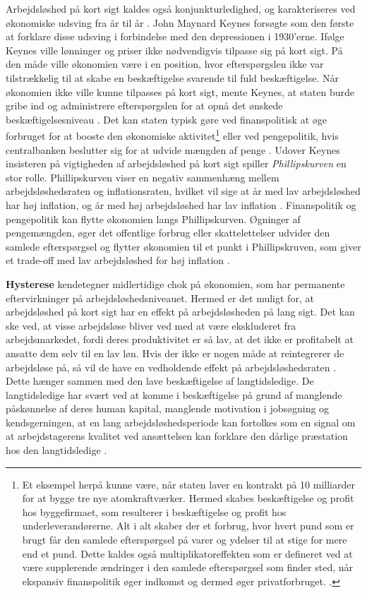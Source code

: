 Arbejdsløshed på kort sigt kaldes også konjunkturledighed, og karakteriseres ved økonomiske udsving fra år til år \parencite[592]{Mankiw2011}. John Maynard Keynes forsøgte som den første at forklare disse udsving i forbindelse med den depressionen i 1930'erne.  Ifølge Keynes ville lønninger og priser ikke nødvendigvis tilpasse sig på kort sigt. På den måde ville økonomien være i en position, hvor efterspørgslen ikke var tilstrækkelig til at skabe en beskæftigelse svarende til fuld beskæftigelse. Når økonomien ikke ville kunne tilpasses på kort sigt, mente Keynes, at staten burde gribe ind og administrere efterspørgslen for at opnå det ønskede beskæftigelsesniveau \parencite[707]{Mankiw2011}. Det kan staten typisk gøre ved finanspolitisk at øge forbruget for at booste den økonomiske aktivitet\footnote{Et eksempel herpå kunne være, når staten laver en kontrakt på 10 milliarder for at bygge tre nye atomkraftværker. Hermed skabes beskæftigelse og profit hos byggefirmaet, som resulterer i beskæftigelse og profit hos underleverandørerne. Alt i alt skaber der et forbrug, hvor hvert pund som er brugt får den samlede efterspørgsel på varer og ydelser til at stige for mere end et pund. Dette kaldes også multiplikatoreffekten som er defineret ved at være supplerende ændringer i den samlede efterspørgsel som finder sted, når  ekspansiv finanspolitik øger indkomst og dermed øger privatforbruget. \parencite[709]{Mankiw2011}.} eller ved pengepolitik, hvis centralbanken beslutter sig for at udvide mængden af penge \parencite[718]{Mankiw2011}. Udover Keynes insisteren på vigtigheden af arbejdsløshed på kort sigt spiller \textit{Phillipskurven} en stor rolle. Phillipskurven viser en negativ sammenhæng mellem arbejdsløshedsraten og inflationsraten, hvilket vil sige at år med lav arbejdsløshed har høj inflation, og år med høj arbejdsløshed har lav inflation \parencite[783]{Mankiw2011}. Finanspolitik og pengepolitik kan flytte økonomien langs Phillipskurven. Øgninger af pengemængden, øger det offentlige forbrug eller skattelettelser udvider den samlede efterspørgsel og flytter økonomien til et punkt i Phillipskruven, som giver et trade-off med lav arbejdsløshed for høj inflation \parencite[785]{Mankiw2011}.

\textbf{Hysterese} kendetegner midlertidige chok på økonomien, som har permanente eftervirkninger på arbejdsløshedsniveauet. Hermed er det muligt for, at arbejdsløshed på kort sigt har en effekt på arbejdsløsheden på lang sigt. Det kan ske ved, at visse arbejdsløse bliver ved med at være ekskluderet fra arbejdsmarkedet, fordi deres produktivitet er så lav, at det ikke er profitabelt at ansatte dem selv til en lav løn. Hvis der ikke er nogen måde at reintegrerer de arbejdsløse på, så vil de have en vedholdende effekt på arbejdsløshedsraten \parencite[477]{Cahuc2004}. Dette hænger sammen med den lave beskæftigelse af langtidsledige. De langtidsledige har svært ved at komme i beskæftigelse på grund af manglende påskønnelse af deres human kapital, manglende motivation i jobsøgning og kendsgerningen, at en lang arbejdsløshedsperiode kan fortolkes som en signal om at arbejdstagerens kvalitet ved ansættelsen kan forklare den dårlige præstation hos den langtidsledige \parencite[479]{Cahuc2004}.


